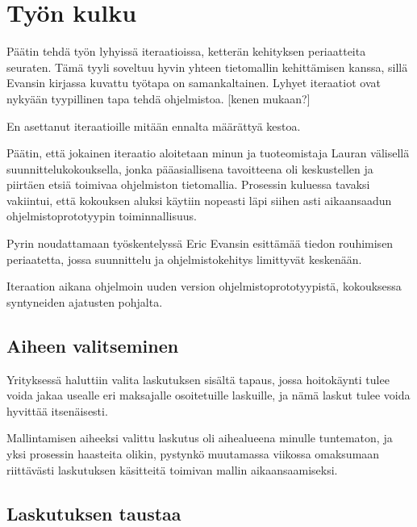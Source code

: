 \vspace{21.5pt}

\hypertarget{tyuxf6n-kulku}{%
\chapter{Työn kulku}\label{tyuxf6n-kulku}}

Päätin tehdä työn lyhyissä iteraatioissa, ketterän kehityksen
periaatteita seuraten. Tämä tyyli soveltuu hyvin yhteen tietomallin
kehittämisen kanssa, sillä Evansin kirjassa kuvattu työtapa on
samankaltainen. Lyhyet iteraatiot ovat nykyään tyypillinen tapa tehdä
ohjelmistoa. {[}kenen mukaan?{]}

En asettanut iteraatioille mitään ennalta määrättyä kestoa.

Päätin, että jokainen iteraatio aloitetaan minun ja tuoteomistaja Lauran
välisellä suunnittelukokouksella, jonka pääasiallisena tavoitteena oli
keskustellen ja piirtäen etsiä toimivaa ohjelmiston tietomallia.
Prosessin kuluessa tavaksi vakiintui, että kokouksen aluksi käytiin
nopeasti läpi siihen asti aikaansaadun ohjelmistoprototyypin
toiminnallisuus.

Pyrin noudattamaan työskentelyssä Eric Evansin esittämää tiedon
rouhimisen periaatetta, jossa suunnittelu ja ohjelmistokehitys
limittyvät keskenään.

Iteraation aikana ohjelmoin uuden version ohjelmistoprototyypistä,
kokouksessa syntyneiden ajatusten pohjalta.

\hypertarget{aiheen-valitseminen}{%
\section{Aiheen valitseminen}\label{aiheen-valitseminen}}

Yrityksessä haluttiin valita laskutuksen sisältä tapaus, jossa
hoitokäynti tulee voida jakaa usealle eri maksajalle osoitetuille
laskuille, ja nämä laskut tulee voida hyvittää itsenäisesti.

Mallintamisen aiheeksi valittu laskutus oli aihealueena minulle
tuntematon, ja yksi prosessin haasteita olikin, pystynkö muutamassa
viikossa omaksumaan riittävästi laskutuksen käsitteitä toimivan mallin
aikaansaamiseksi.

\hypertarget{laskutuksen-taustaa}{%
\section{Laskutuksen taustaa}\label{laskutuksen-taustaa}}


